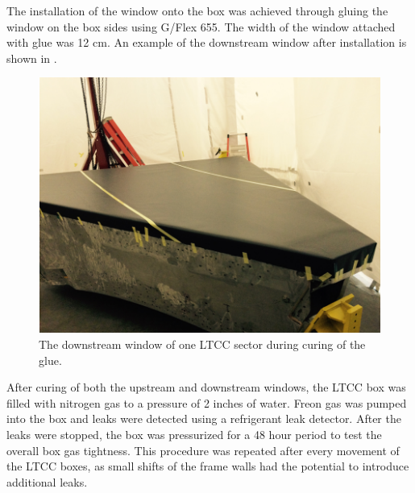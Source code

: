 The installation of the window onto the box was achieved through gluing the window on the box sides using G/Flex 655. The width of the window
attached with glue was 12 cm.
An example of the downstream window after installation is shown in .

\begin{figure}
	\centering
	\includegraphics[width=1.0\columnwidth,keepaspectratio]{img/downstreamWindow.png}
	\caption{The downstream window of one LTCC sector during curing of the glue. }
	\label{fig:downstreamWindow}
\end{figure}

After curing of both the upstream and downstream windows, the LTCC box was filled with nitrogen gas to a pressure of 2 inches of water.
Freon gas was pumped into the box and leaks were detected using a refrigerant leak detector. After the leaks were stopped, the box was pressurized
for a 48 hour period to test the overall box gas tightness. This procedure was repeated after every movement of the LTCC boxes, as small
shifts of the frame walls had the potential to introduce additional leaks.

